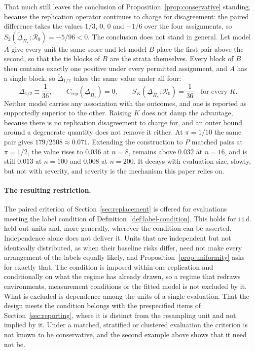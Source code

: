 \documentclass[11pt]{article}
\newcommand{\Regime}{\mathcal{R}}
\newcommand{\PSet}{\Pi_\star}
\newcommand{\Dta}{\widetilde{\Delta}}
\newcommand{\RobDta}{\underline{\widetilde{\Delta}}_{\PSet}}
\theoremstyle{remark}
\begin{document}
That much still leaves the conclusion of Proposition~\ref{prop:conservative} standing, because the replication operator continues to charge for disagreement: the paired difference takes the values $1/3$, $0$, $0$ and $-1/6$ over the four assignments, so $S_2(\RobDta;\Regime_0)=-5/96<0$. The conclusion does not stand in general. Let model $A$ give every unit the same score and let model $B$ place the first pair above the second, so that the tie blocks of $B$ are the strata themselves. Every block of $B$ then contains exactly one positive under every permitted assignment, and $A$ has a single block, so $\Dta_{1/2}$ takes the same value under all four:
\[
\Dta_{1/2}\equiv\frac{1}{36},
\qquad
C_{\mathrm{rep}}(\RobDta)=0,
\qquad
S_K(\RobDta;\Regime_0)=\frac{1}{36}
\quad\text{for every }K .
\]
Neither model carries any association with the outcomes, and one is reported as supportedly superior to the other. Raising $K$ does not damp the advantage, because there is no replication disagreement to charge for, and an outer bound around a degenerate quantity does not remove it either. At $\pi=1/10$ the same pair gives $179/2508\approx0.071$. Extending the construction to $P$ matched pairs at $\pi=1/2$, the value rises to $0.036$ at $n=8$, remains above $0.032$ at $n=16$, and is still $0.013$ at $n=100$ and $0.008$ at $n=200$. It decays with evaluation size, slowly, but not with severity, and severity is the mechanism this paper relies on.

\paragraph{The resulting restriction.}
The paired criterion of Section~\ref{sec:replacement} is offered for evaluations meeting the label condition of Definition~\ref{def:label-condition}. This holds for i.i.d. held-out units and, more generally, wherever the condition can be asserted. Independence alone does not deliver it. Units that are independent but not identically distributed, as when their baseline risks differ, need not make every arrangement of the labels equally likely, and Proposition~\ref{prop:uniformity} asks for exactly that. The condition is imposed within one replication and conditionally on what the regime has already drawn, so a regime that redraws environments, measurement conditions or the fitted model is not excluded by it. What is excluded is dependence among the units of a single evaluation. That the design meets the condition belongs with the prespecified items of Section~\ref{sec:reporting}, where it is distinct from the resampling unit and not implied by it. Under a matched, stratified or clustered evaluation the criterion is not known to be conservative, and the second example above shows that it need not be.
\end{document}
